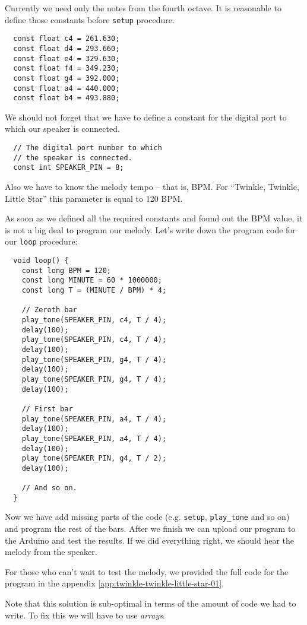 \documentclass[../sparc.tex]{subfiles}
\begin{document}
Currently we need only the notes from the fourth octave.  It is reasonable to
define those constants before \texttt{setup} procedure.

\begin{verbatim}
  const float c4 = 261.630;
  const float d4 = 293.660;
  const float e4 = 329.630;
  const float f4 = 349.230;
  const float g4 = 392.000;
  const float a4 = 440.000;
  const float b4 = 493.880;
\end{verbatim}

We should not forget that we have to define a constant for the digital port to
which our speaker is connected.

\begin{verbatim}
  // The digital port number to which
  // the speaker is connected.
  const int SPEAKER_PIN = 8;
\end{verbatim}

Also we have to know the melody tempo -- that is, \gls{BPM}.  For ``Twinkle,
Twinkle, Little Star'' this parameter is equal to 120 BPM.

As soon as we defined all the required constants and found out the BPM value, it
is not a big deal to program our melody.  Let's write down the program code for
our \texttt{loop} procedure:

\begin{verbatim}
  void loop() {
    const long BPM = 120;
    const long MINUTE = 60 * 1000000;
    const long T = (MINUTE / BPM) * 4;

    // Zeroth bar
    play_tone(SPEAKER_PIN, c4, T / 4);
    delay(100);
    play_tone(SPEAKER_PIN, c4, T / 4);
    delay(100);
    play_tone(SPEAKER_PIN, g4, T / 4);
    delay(100);
    play_tone(SPEAKER_PIN, g4, T / 4);
    delay(100);

    // First bar
    play_tone(SPEAKER_PIN, a4, T / 4);
    delay(100);
    play_tone(SPEAKER_PIN, a4, T / 4);
    delay(100);
    play_tone(SPEAKER_PIN, g4, T / 2);
    delay(100);

    // And so on.
  }
\end{verbatim}

Now we have add missing parts of the code (e.g. \texttt{setup},
\texttt{play\_tone} and so on) and program the rest of the bars.  After we
finish we can upload our program to the Arduino and test the results.  If we did
everything right, we should hear the melody from the speaker.

For those who can't wait to test the melody, we provided the full code for the
program in the appendix \ref{app:twinkle-twinkle-little-star-01}.

Note that this solution is sub-optimal in terms of the amount of code we had to
write.  To fix this we will have to use \emph{arrays}.
\end{document}
